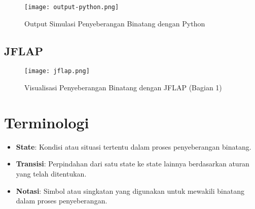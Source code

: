 \documentclass[12pt,a4paper]{article}
\begin{document}
\newpage

\begin{figure}[H]
    \centering
    \texttt{[image: output-python.png]}
    \caption{Output Simulasi Penyeberangan Binatang dengan Python}
    \label{fig:output}
\end{figure}

\subsection*{JFLAP}
\begin{figure}[H]
    \centering
    \texttt{[image: jflap.png]}
    \caption{Visualisasi Penyeberangan Binatang dengan JFLAP (Bagian 1)}
    \label{fig:jflap}
\end{figure}

\section*{Terminologi}
\begin{itemize}
    \item \textbf{State}: Kondisi atau situasi tertentu dalam proses penyeberangan binatang.
    \item \textbf{Transisi}: Perpindahan dari satu state ke state lainnya berdasarkan aturan yang telah ditentukan.
    \item \textbf{Notasi}: Simbol atau singkatan yang digunakan untuk mewakili binatang dalam proses penyeberangan.
\end{itemize}
\end{document}
